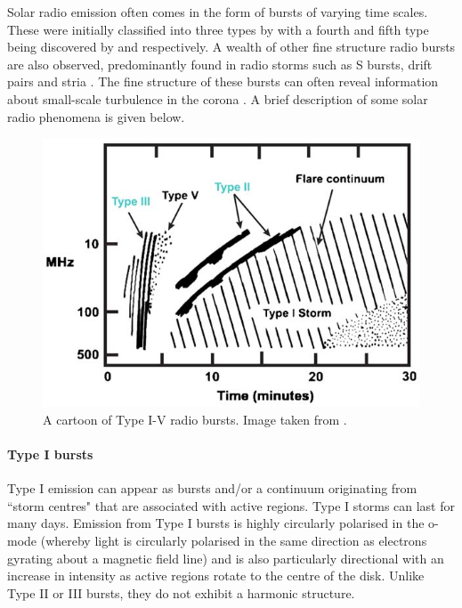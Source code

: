 Solar radio emission often comes in the form of bursts of varying time scales. These were initially classified into three types by \cite{Wild1950b} with a fourth and fifth type being discovered by \cite{Boischot1957} and \cite{Wild1959} respectively. A wealth of other fine structure radio bursts are also observed, predominantly found in radio storms such as S bursts, drift pairs and stria \citep{McConnell1980,Melrose1982,NelsonandMelrose1985}. 
The fine structure of these bursts can often reveal information about small-scale turbulence in the corona \citep{Reid2021}.
A brief description of some solar radio phenomena is given below.
\begin{figure}[ht]
    \centering
    \includegraphics[width=0.75\columnwidth]{Images/Burst_cartoon.jpg}
    \caption[Cartoon of Type I-V radio bursts.]{A cartoon of Type I-V radio bursts. Image taken from \cite{Cliver2009}.}
    \label{fig:burst_cartoon}
\end{figure}
\paragraph{Type I bursts}
Type I emission can appear as bursts and/or a continuum originating from ``storm centres" that are associated with active regions. Type I storms can last for many days. Emission from Type I bursts is highly circularly polarised in the o-mode (whereby light is circularly polarised in the same direction as electrons gyrating about a magnetic field line) and is also particularly directional with an increase in intensity as active regions rotate to the centre of the disk. Unlike Type II or III bursts, they do not exhibit a harmonic structure.
